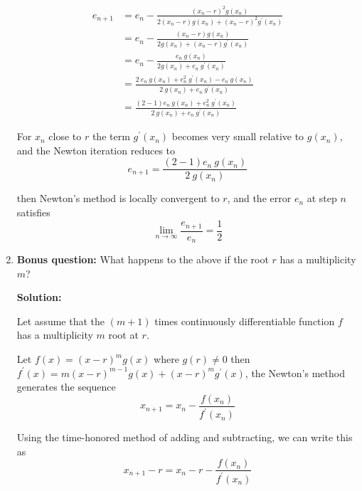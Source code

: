 \documentclass[a4paper,11pt]{report}
\begin{document}
\begin{enumerate}
    \begin{equation*}
    \begin{aligned}
    e_{n+1} &= e_{n} - \frac{(x_{n} - r)^{2} g(x_{n})}{2(x_{n} - r) g(x_{n}) 
    + (x_{n} - r)^{2} g^{\prime}(x_{n})} \\
            &= e_{n} - \frac{(x_{n} - r) g(x_{n})}{2 g(x_{n}) + (x_{n} - r) 
    g^{\prime}(x_{n})} \\
            &= e_{n} - \frac{e_{n}\ g(x_{n})}{2 g(x_{n}) + e_{n}\ g^{\prime}
    (x_{n})} \\
            &= \frac{2\ e_{n}\ g(x_{n}) + e_{n}^{2}\ g^{\prime}(x_{n}) - 
    e_{n}\ g(x_{n})}{2\ g(x_{n}) + e_{n}\ g^{\prime}(x_{n})} \\
            &= \frac{(2 - 1)e_{n}\ g(x_{n}) + e_{n}^{2}\ g^{\prime}(x_{n})}
    {2\ g(x_{n}) + e_{n}\ g^{\prime}(x_{n})}
    \end{aligned}
    \end{equation*}
    
    For $x_{n}$ close to $r$ the term $g^{\prime}(x_{n})$ becomes very small 
    relative to $g(x_{n})$, and the Newton iteration reduces to
    \begin{equation*}
    e_{n+1} = \frac{(2-1)e_{n}\ g(x_{n})}{2\ g(x_{n})}
    \end{equation*}

    then Newton's method is locally convergent to $r$, and the error $e_{n}$ 
    at step $n$ satisfies
    \begin{equation*}
    \lim_{n \rightarrow \infty} \frac{e_{n+1}}{e_{n}} = \frac{1}{2}
    \end{equation*}


    \item \textbf{Bonus question:} What happens to the above if the root $r$ 
    has a multiplicity $m$?
    
    \textbf{Solution:}

    Let assume that the $(m+1)$ times continuously differentiable function 
    $f$ has a multiplicity $m$ root at $r$. 

    Let $f(x) = (x-r)^{m} g(x)$ where $g(r) \neq 0$ then $f^{\prime}(x) = 
    m(x-r)^{m-1} g(x) + (x-r)^{m} g^{\prime}(x)$, the Newton's method generates
    the sequence
    \begin{equation*}
    x_{n+1} = x_{n} - \frac{f(x_{n})}{f^{\prime}(x_{n})} 
    \end{equation*}

    Using the time-honored method of adding and subtracting, we can write this
    as
    \begin{equation*}
    x_{n+1} - r = x_{n} - r - \frac{f(x_{n})}{f^{\prime}(x_{n})}
    \end{equation*}
    

\end{enumerate}
\end{document}
